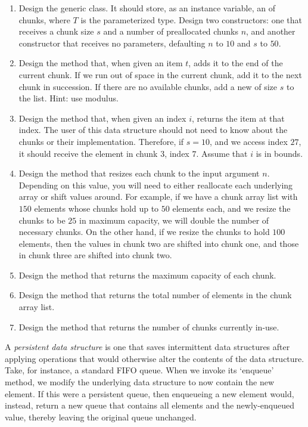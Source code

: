 \begin{enumerate}[label=(\alph*)]
    \item Design the generic  class. It should store, as an instance variable, an  of chunks, where $T$ is the parameterized type. Design two constructors: one that receives a chunk size $s$ and a number of preallocated chunks $n$, and another constructor that receives no parameters, defaulting $n$ to $10$ and $s$ to $50$.
    \item Design the  method that, when given an item $t$, adds it to the end of the current chunk. If we run out of space in the current chunk, add it to the next chunk in succession. If there are no available chunks, add a new  of size $s$ to the list. Hint: use modulus.
    \item Design the  method that, when given an index $i$, returns the item at that index. The user of this data structure should not need to know about the chunks or their implementation. Therefore, if $s=10$, and we access index $27$, it should receive the element in chunk $3$, index $7$. Assume that $i$ is in bounds.
    \item Design the  method that resizes each chunk to the input argument $n$. Depending on this value, you will need to either reallocate each underlying array or shift values around. For example, if we have a chunk array list with $150$ elements whose chunks hold up to $50$ elements each, and we resize the chunks to be $25$ in maximum capacity, we will double the number of necessary chunks. On the other hand, if we resize the chunks to hold $100$ elements, then the values in chunk two are shifted into chunk one, and those in chunk three are shifted into chunk two.
    \item Design the  method that returns the maximum capacity of each chunk.
    \item Design the  method that returns the total number of elements in the chunk array list.
    \item Design the  method that returns the number of chunks currently in-use.
\end{enumerate}


A \emph{persistent data structure} is one that saves intermittent data structures after applying operations that would otherwise alter the contents of the data structure. Take, for instance, a standard FIFO queue. When we invoke its `enqueue' method, we modify the underlying data structure to now contain the new element. If this were a persistent queue, then enqueueing a new element would, instead, return a new queue that contains all elements and the newly-enqueued value, thereby leaving the original queue unchanged.

